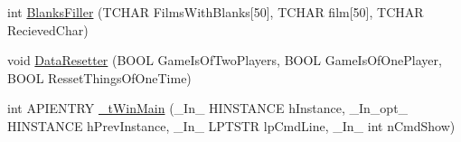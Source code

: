 \begin{DoxyCompactItemize}
\item 
int \hyperlink{_b_o_w-a_01film_01guessing_01game_8cpp_a6cee248a5ed1ce3ff9812facd2773e4c}{Blanks\+Filler} (T\+C\+H\+A\+R Films\+With\+Blanks\mbox{[}50\mbox{]}, T\+C\+H\+A\+R film\mbox{[}50\mbox{]}, T\+C\+H\+A\+R Recieved\+Char)
\item 
void \hyperlink{_b_o_w-a_01film_01guessing_01game_8cpp_a48d94754ebff71d662296b454681612f}{Data\+Resetter} (B\+O\+O\+L Game\+Is\+Of\+Two\+Players, B\+O\+O\+L Game\+Is\+Of\+One\+Player, B\+O\+O\+L Resset\+Things\+Of\+One\+Time)
\item 
int A\+P\+I\+E\+N\+T\+R\+Y \hyperlink{_b_o_w-a_01film_01guessing_01game_8cpp_a6ace68ee976d9c576e8be85cc95ee685}{\+\_\+t\+Win\+Main} (\+\_\+\+In\+\_\+ H\+I\+N\+S\+T\+A\+N\+C\+E h\+Instance, \+\_\+\+In\+\_\+opt\+\_\+ H\+I\+N\+S\+T\+A\+N\+C\+E h\+Prev\+Instance, \+\_\+\+In\+\_\+ L\+P\+T\+S\+T\+R lp\+Cmd\+Line, \+\_\+\+In\+\_\+ int n\+Cmd\+Show)
\end{DoxyCompactItemize}
